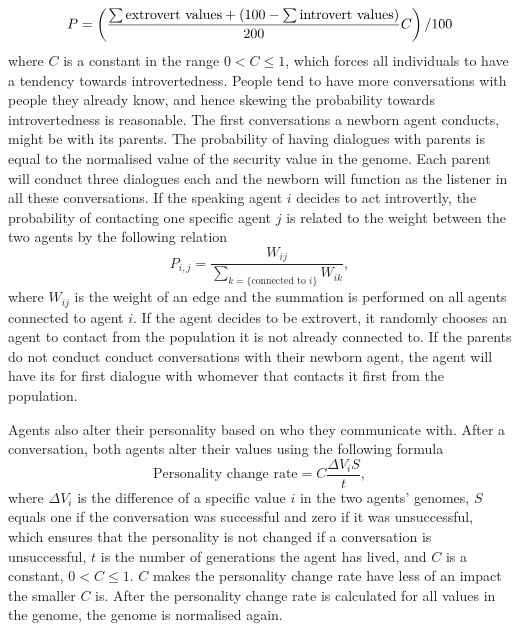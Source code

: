 \begin{equation}\label{eq:chooseListener}
P = \left( \frac{\sum \text{extrovert values} + (100 - \sum \text{introvert values})}{200}C \right)/100
\end{equation}
where $C$ is a constant in the range $0 < C \leq 1$, which forces all individuals to have a tendency towards introvertedness. People tend to have more conversations with people they already know, and hence skewing the probability towards introvertedness is reasonable. The first conversations a newborn agent conducts, might be with its parents. The probability of having dialogues with parents is equal to the normalised value of the security value in the genome. Each parent will conduct three dialogues each and the newborn will function as the listener in all these conversations. If the speaking agent $i$ decides to act introvertly, the probability of contacting one specific agent $j$ is related to the weight between the two agents by the following relation
\begin{equation}\label{eq:intrvertListener}
P_{i,j} = \frac{W_{ij}}{\sum_{k=\{\text{connected to } i\}} {W_{ik}}},
\end{equation}
where $W_{ij}$ is the weight of an edge and the summation is performed on all agents connected to agent $i$. If the agent decides to be extrovert, it randomly chooses an agent to contact from the population it is not already connected to. If the parents do not conduct conduct conversations with their newborn agent, the agent will have its for first dialogue with whomever that contacts it first from the population.

Agents also alter their personality based on who they communicate with. After a conversation, both agents alter their values using the following formula 
\begin{equation}\label{eq:PCR}
\text{Personality change rate} = C\frac{\Delta V_i S}{t},
\end{equation}
where $\Delta V_i$ is the difference of a specific value $i$ in the two agents' genomes, $S$ equals one if the conversation was successful and zero if it was unsuccessful, which ensures that the personality is not changed if a conversation is unsuccessful, $t$ is the number of generations the agent has lived, and $C$ is a constant, $0 < C \leq 1$. $C$ makes the personality change rate have less of an impact the smaller $C$ is. After the personality change rate is calculated for all values in the genome, the genome is normalised again.

